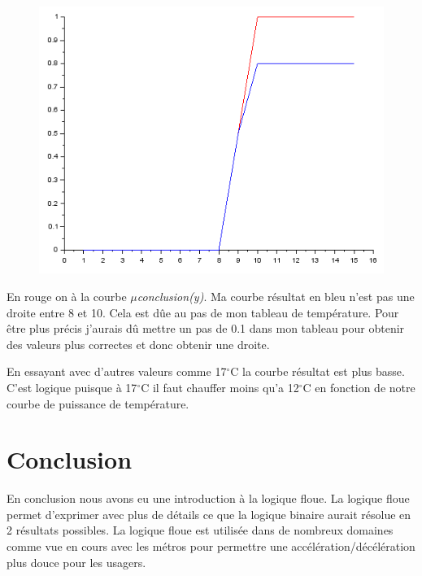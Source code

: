 \documentclass[a4paper,12pt]{report}
\begin{document}
\begin{figure}[!ht]
	\center	
	\includegraphics[scale=0.8]{image/e3-q1.PNG}
\end{figure} 

En rouge on à la courbe $\mu$\textit{conclusion(y)}. Ma courbe résultat en bleu n'est pas une droite entre 8 et 10. Cela est dûe au pas de mon tableau de température. Pour être plus précis j'aurais dû mettre un pas de 0.1 dans mon tableau pour obtenir des valeurs plus correctes et donc obtenir une droite.

En essayant avec d'autres valeurs comme 17$^{\circ}$C la courbe résultat est plus basse. C'est logique puisque à 17$^{\circ}$C il faut chauffer moins qu'a 12$^{\circ}$C en fonction de notre courbe de puissance de température.

\section*{Conclusion}

En conclusion nous avons eu une introduction à la logique floue. La logique floue permet d'exprimer avec plus de détails ce que la logique binaire aurait résolue en 2 résultats possibles. La logique floue est utilisée dans de nombreux domaines comme vue en cours avec les métros pour permettre une accélération/décélération plus douce pour les usagers.
\end{document}
